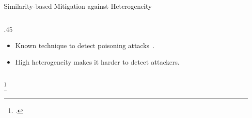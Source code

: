 

\begin{frame}{Similarity-based Mitigation against Heterogeneity}

  \begin{columns}
    \begin{column}{.45\textwidth}
      \begin{itemize}[<+->]
        \item Known technique to detect poisoning attacks~\autocite{tolpegin_DataPoisoningAttacks_2020}.
        \item High heterogeneity makes it harder to detect attackers.
      \end{itemize}
    \end{column}

  \end{columns}

  \footcite*{tolpegin_DataPoisoningAttacks_2020}

\end{frame}


